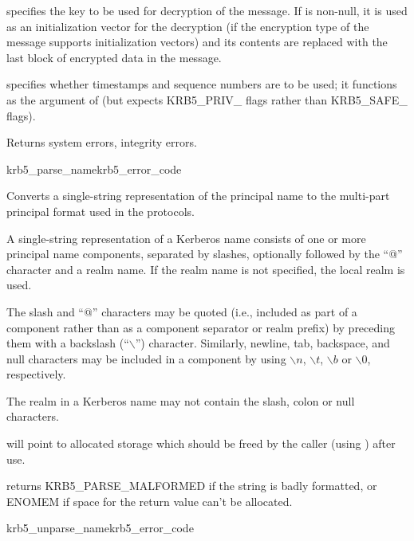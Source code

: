  specifies the key to be used for decryption of the
message.  If  is non-null, it is used as an
initialization vector for the decryption (if the encryption type of
the message supports initialization vectors) and its contents are
replaced with the last block of encrypted data in the message.

 specifies whether timestamps and sequence
numbers are to be used; it functions as the 
argument of  (but expects KRB5_PRIV_ flags
rather than KRB5_SAFE_ flags).

Returns system errors, integrity errors.

\begin{funcdecl}{krb5_parse_name}{krb5_error_code}{\funcin}
\funcout
{}
\end{funcdecl}

Converts a single-string representation  of the
principal name to the multi-part principal format used in the protocols.

A single-string representation of a Kerberos name consists of one or
more principal name components, separated by slashes, optionally
followed by the ``@'' character and a realm name.  If the realm name
is not specified, the local realm is used.

The slash and ``@'' characters may be quoted (i.e., included as part
of a component rather than as a component separator or realm prefix)
by preceding them with a backslash (``$\backslash$'') character.
Similarly, newline, tab, backspace, and null characters may be
included in a component by using $\backslash{}n$, $\backslash{}t$,
$\backslash{}b$ or $\backslash{}0$, respectively.

The realm in a Kerberos name may not contain the slash, colon or null
characters.

 will point to allocated storage which should be freed by
the caller (using ) after use.

 returns KRB5_PARSE_MALFORMED if the string is
 badly formatted, or ENOMEM if space for the return value can't be
allocated.

\begin{funcdecl}{krb5_unparse_name}{krb5_error_code}{\funcin}
\funcout
{}
\end{funcdecl}

